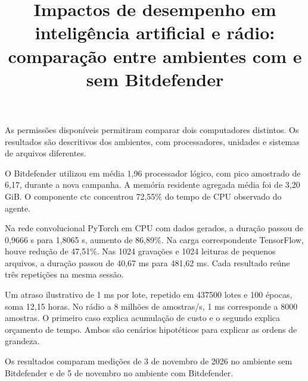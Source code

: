 \documentclass[11pt,a4paper]{article}
\title{Impactos de desempenho em inteligência artificial e rádio:\\ comparação entre ambientes com e sem Bitdefender}
\author{}
\date{}
\begin{document}
\maketitle
As permissões disponíveis permitiram comparar dois computadores distintos. Os resultados são descritivos dos ambientes, com processadores, unidades e sistemas de arquivos diferentes.

O Bitdefender utilizou em média 1,96 processador lógico, com pico amostrado de 6,17, durante a nova campanha. A memória residente agregada média foi de 3,20 GiB. O componente ctc concentrou 72,55\% do tempo de CPU observado do agente.

Na rede convolucional PyTorch em CPU com dados gerados, a duração passou de 0,9666 s para 1,8065 s, aumento de 86,89\%. Na carga correspondente TensorFlow, houve redução de 47,51\%. Nas 1024 gravações e 1024 leituras de pequenos arquivos, a duração passou de 40,67 ms para 481,62 ms. Cada resultado reúne três repetições na mesma sessão.

Um atraso ilustrativo de 1 ms por lote, repetido em 437500 lotes e 100 épocas, soma 12,15 horas. No rádio a 8 milhões de amostras/s, 1 ms corresponde a 8000 amostras. O primeiro caso explica acumulação de custo e o segundo explica orçamento de tempo. Ambos são cenários hipotéticos para explicar as ordens de grandeza.

Os resultados comparam medições de 3 de novembro de 2026 no ambiente sem Bitdefender e de 5 de novembro no ambiente com Bitdefender.
\end{document}
